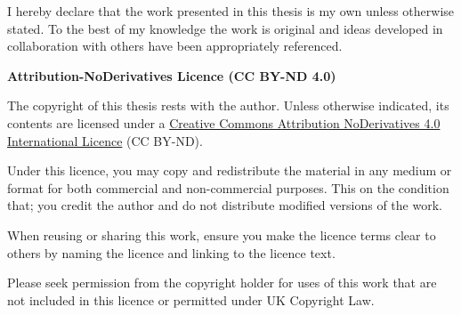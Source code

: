 



I hereby declare that the work presented in this thesis is my own unless otherwise stated. To the best of my knowledge the work is original and ideas developed in collaboration with others have been appropriately referenced.






\textbf{Attribution-NoDerivatives Licence (CC BY-ND 4.0)}

The copyright of this thesis rests with the author. Unless otherwise indicated, its contents are licensed under a \href{https://creativecommons.org/licenses/by-nd/4.0/}{Creative Commons Attribution NoDerivatives 4.0 International Licence}  (CC BY-ND).

Under this licence, you may copy and redistribute the material in any medium or format for both commercial and non-commercial purposes.  This on the condition that; you credit the author and do not distribute modified versions of the work.

When reusing or sharing this work, ensure you make the licence terms clear to others by naming the licence and linking to the licence text.

Please seek permission from the copyright holder for uses of this work that are not included in this licence or permitted under UK Copyright Law.
